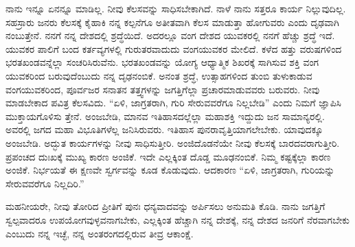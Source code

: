 ನಾನು ಇನ್ನೂ ಏನನ್ನೂ ಮಾಡಿಲ್ಲ. ನೀವು ಕೆಲಸವನ್ನು ಸಾಧಿಸಬೇಕಾಗಿದೆ. ನಾಳೆ ನಾನು ಸತ್ತರೂ ಕಾರ್ಯ ನಿಲ್ಲುವುದಿಲ್ಲ. ಸಹಸ್ರಾರು ಜನರು ಕೆಲಸಕ್ಕೆ ಕೈಹಾಕಿ ನನ್ನ ಕಲ್ಪನೆಗೂ ಅತೀತವಾಗಿ ಕೆಲಸ ಮಾಡುತ್ತಾ ಹೋಗುವರು ಎಂದು ದೃಢವಾಗಿ ನಂಬುತ್ತೇನೆ. ನನಗೆ ನನ್ನ ದೇಶದಲ್ಲಿ ಶ್ರದ್ಧೆಯಿದೆ. ಅದರಲ್ಲೂ ವಂಗ ದೇಶದ ಯುವಕರಲ್ಲಿ ನನಗೆ ಹೆಚ್ಚು ಶ್ರದ್ಧೆ ಇದೆ. ಯುವಕರ ಪಾಲಿಗೆ ಬಂದ ಕರ್ತವ್ಯಗಳಲ್ಲಿ ಗುರುತರವಾದುದು ವಂಗಯುವಕರ ಮೇಲಿದೆ. ಕಳೆದ ಹತ್ತು ವರುಷಗಳಿಂದ ಭರತಖಂಡವನ್ನೆಲ್ಲಾ ಸಂಚರಿಸಿರುವೆನು. ಭರತಖಂಡವನ್ನು ಯೋಗ್ಯ ಆಧ್ಯಾತ್ಮಿಕ ಶಿಖರಕ್ಕೆ ಸಾಗಿಸುವ ಶಕ್ತಿ ವಂಗ ಯುವಕರಿಂದ ಬರುವುದೆಂಬುದು ನನ್ನ ದೃಢನಂಬಿಕೆ. ಅನಂತ ಶ್ರದ್ಧೆ, ಉತ್ಸಾಹಗಳಿಂದ ತುಂಬಿ ತುಳುಕಾಡುವ ವಂಗಯುವಕರಿಂದ, ಪೂರ್ವಜರ ಸನಾತನ ತತ್ತ್ವಗಳನ್ನು ಜಗತ್ತಿಗೆಲ್ಲಾ ಪ್ರಚಾರಮಾಡುವವರು ಬರುವರು. ನೀವು ಮಾಡಬೇಕಾದ ಪವಿತ್ರ ಕೆಲಸವಿದು. “ಏಳಿ, ಜಾಗ್ರತರಾಗಿ, ಗುರಿ ಸೇರುವವರೆಗೂ ನಿಲ್ಲಬೇಡಿ” ಎಂದು ನಿಮಗೆ ಜ್ಞಾಪಿಸಿ ಮುಕ್ತಾಯಗೊಳಿಸು ತ್ತೇನೆ. ಅಂಜಬೇಡಿ, ಮಾನವ ಇತಿಹಾಸದಲ್ಲೆಲ್ಲಾ ಮಹಾಶಕ್ತಿ ಇದ್ದುದು ಜನ ಸಾಮಾನ್ಯರಲ್ಲಿ. ಅವರಲ್ಲಿ ಜಗದ ಮಹಾ ವಿಭೂತಿಗಳೆಲ್ಲ ಜನಿಸಿರುವರು. ಇತಿಹಾಸ ಪುನರಾವೃತ್ತಿಯಾಗಲೇಬೇಕು. ಯಾವುದಕ್ಕೂ ಅಂಜಬೇಡಿ. ಅದ್ಭುತ ಕಾರ್ಯಗಳನ್ನು ನೀವು ಸಾಧಿಸುತ್ತೀರಿ. ಅಂಜಿದೊಡನೆಯೇ ನೀವು ಕೆಲಸಕ್ಕೆ ಬಾರದವರಾಗುತ್ತೀರಿ. ಪ್ರಪಂಚದ ದುಃಖಕ್ಕೆ ಮುಖ್ಯ ಕಾರಣ ಅಂಜಿಕೆ. ಇದೇ ಎಲ್ಲಕ್ಕಿಂತ ದೊಡ್ಡ ಮೂಢನಂಬಿಕೆ. ನಿಮ್ಮ ಕಷ್ಟಕ್ಕೆಲ್ಲಾ ಕಾರಣ ಅಂಜಿಕೆ. ನಿರ್ಭಯತೆ ಈ ಕ್ಷಣವೇ ಸ್ವರ್ಗವನ್ನು ಕೂಡ ಕೊಡುವುದು. ಆದಕಾರಣ “ಏಳಿ, ಜಾಗ್ರತರಾಗಿ, ಗುರಿಯನ್ನು ಸೇರುವವರೆಗೂ ನಿಲ್ಲದಿರಿ.”

ಮಹನೀಯರೇ, ನೀವು ತೋರಿದ ಪ್ರೀತಿಗೆ ಪುನಃ ಧನ್ಯವಾದವನ್ನು ಅರ್ಪಿಸಲು ಅನುಮತಿ ಕೊಡಿ. ನಾನು ಜಗತ್ತಿಗೆ ಸ್ವಲ್ಪವಾದರೂ ಉಪಯೋಗವುಳ್ಳವನಾಗಬೇಕು, ಎಲ್ಲಕ್ಕಿಂತ ಹೆಚ್ಚಾಗಿ ನನ್ನ ದೇಶಕ್ಕೆ, ನನ್ನ ದೇಶದ ಜನರಿಗೆ ನೆರವಾಗಬೇಕು ಎಂಬುದು ನನ್ನ ಇಚ್ಛೆ, ನನ್ನ ಅಂತರಂಗದಲ್ಲಿರುವ ತೀವ್ರ ಆಕಾಂಕ್ಷೆ. 

